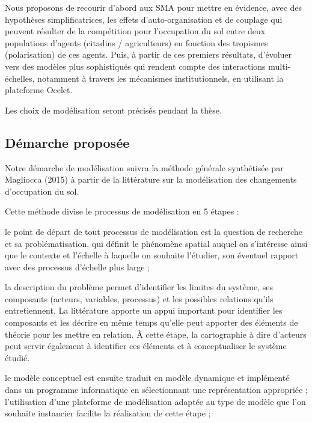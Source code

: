 Nous proposons de recourir d'abord aux SMA pour
mettre en évidence, avec des hypothèses simplificatrices,
les effets d'auto-organisation et de couplage
qui peuvent résulter de la compétition pour l'occupation du sol
entre deux populations d'agents (citadins / agriculteurs)
en fonction des tropismes (polarisation) de ces agents.
Puis, à partir de ces premiers résultats,
d'évoluer vers des modèles plus sophistiqués qui rendent compte
des interactions multi-échelles, notamment à travers les mécanismes institutionnels,
en utilisant la plateforme Ocelet.

Les choix de modélisation seront précisés pendant la thèse.


\subsection{Démarche proposée}

Notre démarche de modélisation suivra la méthode générale synthétisée par Magliocca (2015)
à partir de la littérature sur la modélisation des changements d'occupation du sol.

Cette méthode divise le processus de modélisation en 5 étapes :

\startitemize[n]

\item le point de départ de tout processus de modélisation
   est la question de recherche et sa problématisation,
   qui définit le phénomène spatial auquel on s'intéresse
   ainsi que le contexte et l'échelle à laquelle on souhaite l'étudier,
   son éventuel rapport avec des processus d'échelle plus large ;

\item la description du problème permet d'identifier les limites du système,
   ses composants (acteurs, variables, processus)
   et les possibles relations qu'ils entretiennent.
   La littérature apporte
   un appui important pour identifier les composants et
   les décrire en même temps qu'elle peut apporter
   des éléments de théorie pour les mettre en relation.
   À cette étape, la cartographie à dire d'acteurs peut
   servir également à identifier ces éléments et à conceptualiser
   le système étudié.

\item le modèle conceptuel est ensuite traduit en modèle dynamique
   et implémenté dans un programme informatique
   en sélectionnant une représentation appropriée ;
   l'utilisation d'une plateforme de modélisation
   adaptée au type de modèle que l'on souhaite instancier
   facilite la réalisation de cette étape ;

